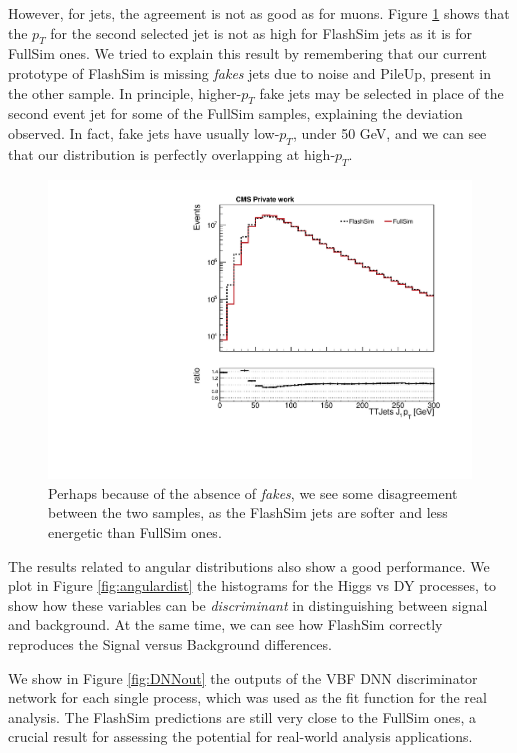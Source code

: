 However, for jets, the agreement is not as good as for muons. Figure \ref{fig:j1pt} shows that the $p_T$ for the second selected jet is not as high for FlashSim jets as it is for FullSim ones. We tried to explain this result by remembering that our current prototype of FlashSim is missing \emph{fakes} jets due to noise and PileUp, present in the other sample. In principle, higher-$p_T$ fake jets may be selected in place of the second event jet for some of the FullSim samples, explaining the deviation observed. In fact, fake jets have usually low-$p_T$, under 50 GeV, and we can see that our distribution is perfectly overlapping at high-$p_T$.

\begin{figure}
    \centering
    \includegraphics[width=\linewidth]{gfx/ch6/TTJets_J1_pt____log.pdf}
    \caption[J$_1$ $p_T$]{Perhaps because of the absence of \emph{fakes}, we see some disagreement between the two samples, as the FlashSim jets are softer and less energetic than FullSim ones.}
    \label{fig:j1pt}
\end{figure}

The results related to angular distributions also show a good performance. We plot in Figure \ref{fig:angulardist} the histograms for the Higgs vs DY processes, to show how these variables can be \emph{discriminant} in distinguishing between signal and background. At the same time, we can see how FlashSim correctly reproduces the Signal versus Background differences.

We show in Figure \ref{fig:DNNout} the outputs of the VBF DNN discriminator network for each single process, which was used as the fit function for the real analysis. The FlashSim predictions are still very close to the FullSim ones, a crucial result for assessing the potential for real-world analysis applications.

